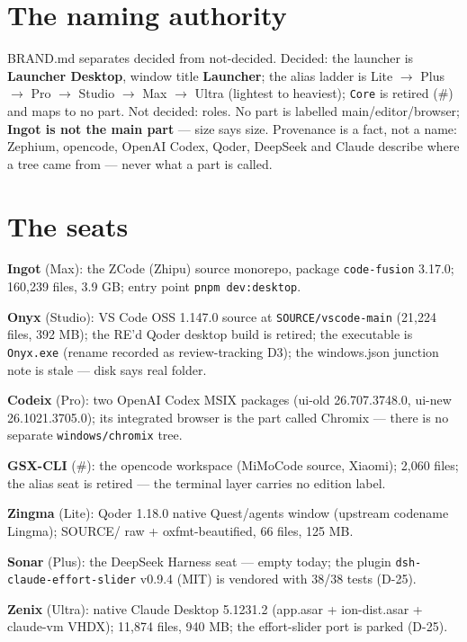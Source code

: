 \section{The naming authority}

BRAND.md separates decided from not-decided. Decided: the launcher is \textbf{Launcher Desktop},
window title \textbf{Launcher}; the alias ladder is Lite $\to$ Plus $\to$ Pro $\to$ Studio
$\to$ Max $\to$ Ultra (lightest to heaviest); \texttt{Core} is retired (\#) and maps to no part.
Not decided: roles. No part is labelled main/editor/browser; \textbf{Ingot is not the main
part} --- size says size. Provenance is a fact, not a name: Zephium, opencode, OpenAI Codex,
Qoder, DeepSeek and Claude describe where a tree came from --- never what a part is called.

\section{The seats}

\textbf{Ingot} (Max): the ZCode (Zhipu) source monorepo, package \texttt{code-fusion} 3.17.0;
160{,}239 files, 3.9 GB; entry point \texttt{pnpm dev:desktop}.

\textbf{Onyx} (Studio): VS Code OSS 1.147.0 source at \texttt{SOURCE/vscode-main} (21{,}224
files, 392 MB); the RE'd Qoder desktop build is retired; the executable is \texttt{Onyx.exe}
(rename recorded as review-tracking D3); the windows.json junction note is stale --- disk says
real folder.

\textbf{Codeix} (Pro): two OpenAI Codex MSIX packages (ui-old 26.707.3748.0, ui-new
26.1021.3705.0); its integrated browser is the part called Chromix --- there is no separate
\texttt{windows/chromix} tree.

\textbf{GSX-CLI} (\#): the opencode workspace (MiMoCode source, Xiaomi); 2{,}060 files; the
alias seat is retired --- the terminal layer carries no edition label.

\textbf{Zingma} (Lite): Qoder 1.18.0 native Quest/agents window (upstream codename Lingma);
SOURCE/ raw + oxfmt-beautified, 66 files, 125 MB.

\textbf{Sonar} (Plus): the DeepSeek Harness seat --- empty today; the plugin
\texttt{dsh-claude-effort-slider} v0.9.4 (MIT) is vendored with 38/38 tests (D-25).

\textbf{Zenix} (Ultra): native Claude Desktop 5.1231.2 (app.asar + ion-dist.asar + claude-vm
VHDX); 11{,}874 files, 940 MB; the effort-slider port is parked (D-25).


